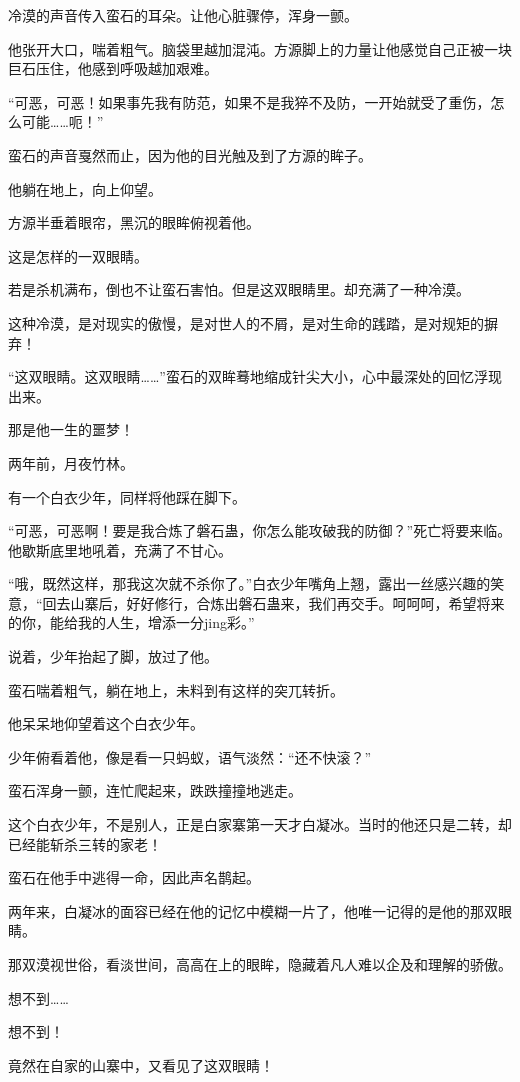 \begin{this_body}
冷漠的声音传入蛮石的耳朵。让他心脏骤停，浑身一颤。

他张开大口，喘着粗气。脑袋里越加混沌。方源脚上的力量让他感觉自己正被一块巨石压住，他感到呼吸越加艰难。

“可恶，可恶！如果事先我有防范，如果不是我猝不及防，一开始就受了重伤，怎么可能……呃！”

蛮石的声音戛然而止，因为他的目光触及到了方源的眸子。

他躺在地上，向上仰望。

方源半垂着眼帘，黑沉的眼眸俯视着他。

这是怎样的一双眼睛。

若是杀机满布，倒也不让蛮石害怕。但是这双眼睛里。却充满了一种冷漠。

这种冷漠，是对现实的傲慢，是对世人的不屑，是对生命的践踏，是对规矩的摒弃！

“这双眼睛。这双眼睛……”蛮石的双眸蓦地缩成针尖大小，心中最深处的回忆浮现出来。

那是他一生的噩梦！

两年前，月夜竹林。

有一个白衣少年，同样将他踩在脚下。

“可恶，可恶啊！要是我合炼了磐石蛊，你怎么能攻破我的防御？”死亡将要来临。他歇斯底里地吼着，充满了不甘心。

“哦，既然这样，那我这次就不杀你了。”白衣少年嘴角上翘，露出一丝感兴趣的笑意，“回去山寨后，好好修行，合炼出磐石蛊来，我们再交手。呵呵呵，希望将来的你，能给我的人生，增添一分jing彩。”

说着，少年抬起了脚，放过了他。

蛮石喘着粗气，躺在地上，未料到有这样的突兀转折。

他呆呆地仰望着这个白衣少年。

少年俯看着他，像是看一只蚂蚁，语气淡然：“还不快滚？”

蛮石浑身一颤，连忙爬起来，跌跌撞撞地逃走。

这个白衣少年，不是别人，正是白家寨第一天才白凝冰。当时的他还只是二转，却已经能斩杀三转的家老！

蛮石在他手中逃得一命，因此声名鹊起。

两年来，白凝冰的面容已经在他的记忆中模糊一片了，他唯一记得的是他的那双眼睛。

那双漠视世俗，看淡世间，高高在上的眼眸，隐藏着凡人难以企及和理解的骄傲。

想不到……

想不到！

竟然在自家的山寨中，又看见了这双眼睛！


\end{this_body}

